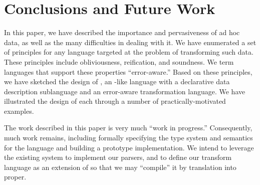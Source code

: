 \section{Conclusions and Future Work}
\label{sec:conclusion}

In this paper, we have described the importance and pervasiveness of
ad hoc data, as well as the many difficulties in dealing with it.  We
have enumerated a set of principles for any language targeted at the
problem of transforming such data.  These principles include
obliviousness, reification, and soundness. We term languages that
support these properties ``error-aware.''  Based on these principles,
we have sketched the design of \datatype{}, an \ml{}-like language
with a declarative data description sublanguage and an error-aware
transformation language.  We have illustrated the design of each
through a number of practically-motivated examples.

The work described in this paper is very much ``work in progress.''
Consequently, much work remains, including formally specifying the
type system and semantics for the language and building a prototype
implementation.  We intend to leverage the existing \pads{} system to
implement our parsers, and to define our transform language as an
extension of \sml{} so that we may ``compile'' it by translation into
\sml{} proper.



